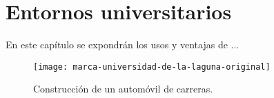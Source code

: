 %
 
\chapter{Entornos universitarios } \label{chap:RAEntornosUniversitarios}  

En este capítulo se expondrán los usos y ventajas de ...

\begin{figure}[h]
    \centering
    \texttt{[image: marca-universidad-de-la-laguna-original]}
    \caption{Construcción de un automóvil de carreras.}
    \label{fig:xyz}
\end{figure}    
